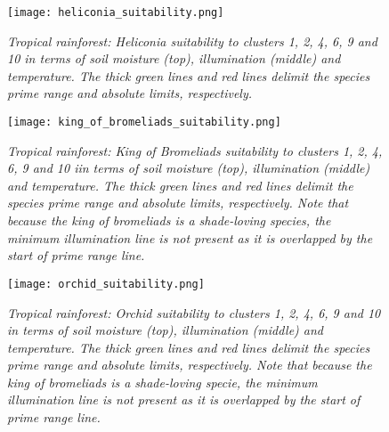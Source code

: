 \begin{figure}[htb!]
\center
	\texttt{[image: heliconia\_suitability.png]}
	\caption{\textit{Tropical rainforest: Heliconia suitability to clusters 1, 2, 4, 6, 9 and 10 in terms of soil moisture (top), illumination (middle) and temperature. The thick green lines and red lines delimit the species prime range and absolute limits, respectively.}}
	\label{fig:results_tropical_heliconia_suitability}
\end{figure}

\begin{figure}[htb!]
\center
	\texttt{[image: king\_of\_bromeliads\_suitability.png]}
	\caption{ \textit{Tropical rainforest: King of Bromeliads suitability to clusters 1, 2, 4, 6, 9 and 10 iin terms of soil moisture (top), illumination (middle) and temperature. The thick green lines and red lines delimit the species prime range and absolute limits, respectively. Note that because the king of bromeliads is a shade-loving species, the minimum illumination line is not present as it is overlapped by the start of prime range line.}}
	\label{fig:results_tropical_king_of_bromeliads_suitability}
\end{figure}

\begin{figure}[htb!]
\center
	\texttt{[image: orchid\_suitability.png]}
	\caption{ \textit{Tropical rainforest: Orchid suitability to clusters 1, 2, 4, 6, 9 and 10 in terms of soil moisture (top), illumination (middle) and temperature. The thick green lines and red lines delimit the species prime range and absolute limits, respectively. Note that because the king of bromeliads is a shade-loving specie, the minimum illumination line is not present as it is overlapped by the start of prime range line.}}
	\label{fig:results_tropical_orchid_suitability}
\end{figure}

